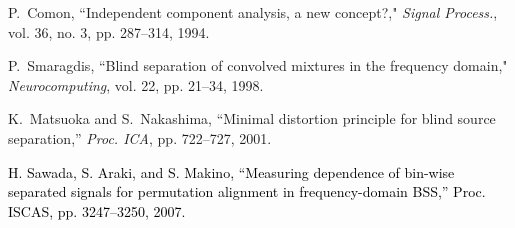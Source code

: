 \documentclass[a4j]{jsarticle}
\newcommand{\red}[1]{\textcolor{black}{#1}}
\begin{document}
\begin{thebibliography}{9}%

P.~Comon, ``Independent component analysis, a new concept?," {\em Signal Process.}, vol. 36, no. 3, pp. 287--314, 1994.

P.~Smaragdis, ``Blind separation of convolved mixtures in the frequency domain," {\em Neurocomputing}, vol. 22, pp. 21--34, 1998.

K.~Matsuoka and S.~Nakashima, ``Minimal distortion principle for blind source separation,'' {\em Proc. ICA}, pp. 722--727, 2001.

\red{H. Sawada, S. Araki, and S. Makino, ``Measuring dependence of bin-wise separated signals for permutation alignment in frequency-domain BSS,'' Proc. ISCAS, pp. 3247--3250, 2007.}

\end{thebibliography}
\end{document}

